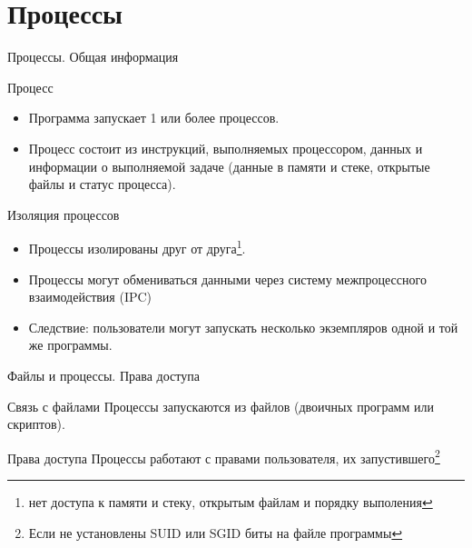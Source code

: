  


\lstset{basicstyle=\tiny}



\firstframe

\section{Процессы}

\begin{frame}{Процессы. Общая информация}
  \begin{block}{Процесс}
    \begin{itemize}
      \item Программа запускает 1 или более процессов. 
      \item Процесс состоит из инструкций, выполняемых процессором, данных и информации о выполняемой задаче (данные в памяти и стеке, открытые файлы и статус процесса).
    \end{itemize} 
  \end{block} \pause

  \begin{block}{Изоляция процессов}
    \begin{itemize}
      \item Процессы изолированы друг от друга\footnote{нет доступа к памяти и стеку, открытым файлам и порядку выполения}.
      \item Процессы могут обмениваться данными через систему межпроцессного взаимодействия (IPC)
      \item Следствие: пользователи могут запускать несколько экземпляров одной и той же программы. 
    \end{itemize}
  \end{block}

\end{frame}

\begin{frame}{Файлы и процессы. Права доступа}

  \begin{block}{Связь с файлами}
    Процессы запускаются из файлов (двоичных программ или скриптов).
  \end{block}

  \begin{block}{Права доступа}
    Процессы работают с правами пользователя, их запустившего\footnote{Если не установлены SUID или SGID биты на файле программы}
  \end{block}

\end{frame}

